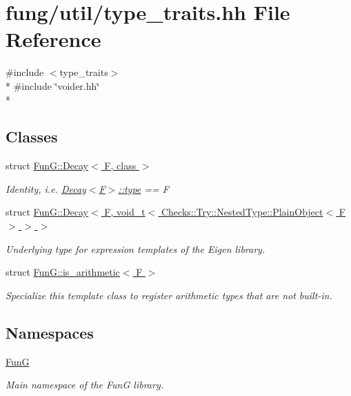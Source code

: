 \hypertarget{type__traits_8hh}{}\section{fung/util/type\+\_\+traits.hh File Reference}
\label{type__traits_8hh}
{\ttfamily \#include $<$type\+\_\+traits$>$}\\*
{\ttfamily \#include \char`\"{}voider.\+hh\char`\"{}}\\*
\subsection*{Classes}
\begin{DoxyCompactItemize}
\item 
struct \hyperlink{structFunG_1_1Decay}{Fun\+G\+::\+Decay$<$ F, class $>$}
\begin{DoxyCompactList}\small\item\em Identity, i.\+e. \hyperlink{structFunG_1_1Decay_a4b2916cbb7c8587ab3fccc9b896b9df4}{Decay$<$\+F$>$\+::type} == F \end{DoxyCompactList}\item 
struct \hyperlink{structFunG_1_1Decay_3_01F_00_01void__t_3_01Checks_1_1Try_1_1NestedType_1_1PlainObject_3_01F_01_4_01_4_01_4}{Fun\+G\+::\+Decay$<$ F, void\+\_\+t$<$ Checks\+::\+Try\+::\+Nested\+Type\+::\+Plain\+Object$<$ F $>$ $>$ $>$}
\begin{DoxyCompactList}\small\item\em Underlying type for expression templates of the Eigen library. \end{DoxyCompactList}\item 
struct \hyperlink{structFunG_1_1is__arithmetic}{Fun\+G\+::is\+\_\+arithmetic$<$ F $>$}
\begin{DoxyCompactList}\small\item\em Specialize this template class to register arithmetic types that are not built-\/in. \end{DoxyCompactList}\end{DoxyCompactItemize}
\subsection*{Namespaces}
\begin{DoxyCompactItemize}
\item 
 \hyperlink{namespaceFunG}{FunG}
\begin{DoxyCompactList}\small\item\em Main namespace of the FunG library. \end{DoxyCompactList}\end{DoxyCompactItemize}
